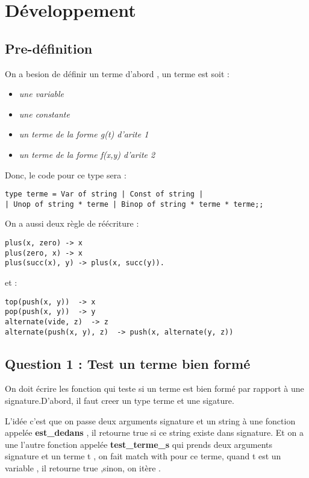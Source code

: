 \documentclass[12pt]{amsart}
\begin{document}
\section{ Développement }
                 \subsection{Pre-définition}
		        On a besion de définir un terme d'abord , un terme est soit :
		        \begin{itemize}[label=-]
		        \item \textit{une variable} 
			\item \textit{une constante} 
			\item \textit{un terme de la forme g(t) d'arite 1} 
			\item \textit{un terme de la forme f(x,y) d'arite 2}
		        \end{itemize}
		       
		        Donc, le code pour ce type sera :
		        \newline
		       \begin{lstlisting}
type terme = Var of string | Const of string | 
| Unop of string * terme | Binop of string * terme * terme;;
			\end{lstlisting}
	                
	                On a aussi deux règle de réécriture : 
	    		 \begin{lstlisting}
plus(x, zero) -> x
plus(zero, x) -> x
plus(succ(x), y) -> plus(x, succ(y)).
			 \end{lstlisting}
			 et :
			  \begin{lstlisting}
top(push(x, y))  -> x
pop(push(x, y))  -> y
alternate(vide, z)  -> z
alternate(push(x, y), z)  -> push(x, alternate(y, z))			  
			   \end{lstlisting}
\newpage		
	    	\subsection{Question 1 : Test un terme bien formé}	
  		  On doit écrire les fonction qui teste si un terme est bien formé par 
                   rapport à une signature.D'abord, il faut creer un type terme et une sigature.
                 
                   L'idée c'est que on passe deux arguments signature et un string à une fonction appelée  
                  \textbf{est\_dedans} , il retourne true si ce string existe dans signature. Et on a une l'autre
                  fonction appelée  \textbf{test\_terme\_s} qui prends deux arguments signature et un terme t
                  , on fait match with pour ce terme, quand t est un variable , il retourne true ,sinon, on itère .
               
\end{document}

